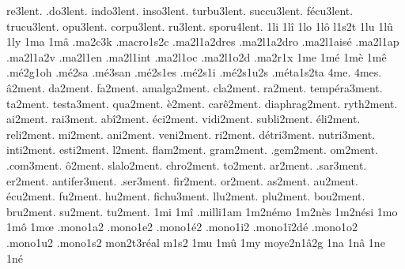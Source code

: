 {    re3lent.
   .do3lent.
  indo3lent.
  inso3lent.
 turbu3lent.
 succu3lent.
  fécu3lent.
 trucu3lent.
   opu3lent.
 corpu3lent.
    ru3lent.
 sporu4lent.
%
1li
1lî
1lo
1lô
l1s2t
1lu
1lû
1ly
1ma
1mâ
                    .ma2c3k
                    .macro1s2c
                    .ma2l1a2dres
                    .ma2l1a2dro
                    .ma2l1aisé
                    .ma2l1ap
                    .ma2l1a2v
                    .ma2l1en
                    .ma2l1int
                    .ma2l1oc
                    .ma2l1o2d
                    .ma2r1x %
1me
1mé
1mè
1mê
                    .mé2g1oh
                    .mé2sa %
                    .mé3san %
                    .mé2s1es
                    .mé2s1i
                    .mé2s1u2s
                    .méta1s2ta
4me.
4mes.
       â2ment.
       da2ment.
       fa2ment.
   amalga2ment.
      cla2ment.
       ra2ment.
  tempéra3ment.
       ta2ment.
    testa3ment.
      qua2ment.
        è2ment.
     carê2ment.
 diaphrag2ment.
     ryth2ment.
       ai2ment.
      rai3ment.
      abî2ment.
      éci2ment.
     vidi2ment.
    subli2ment.
      éli2ment.
     reli2ment.
       mi2ment.
      ani2ment.
     veni2ment.
       ri2ment.
    détri3ment.
    nutri3ment.
     inti2ment.
     esti2ment.
        l2ment.
     flam2ment.
     gram2ment.
     .gem2ment.
       om2ment.
     .com3ment.
        ô2ment.
    slalo2ment.
     chro2ment.
       to2ment.
       ar2ment.
     .sar3ment.
       er2ment.
  antifer3ment.
     .ser3ment.
      fir2ment.
       or2ment.
       as2ment.
       au2ment.
      écu2ment.
       fu2ment.
       hu2ment.
    fichu3ment.
      llu2ment.
      plu2ment.
      bou2ment.
      bru2ment.
       su2ment.
       tu2ment.
%
1mi
1mî
                    .milli1am
                    1m2némo
                    1m2nès
                    1m2nési
1mo
1mô
1mœ
                    .mono1a2
                    .mono1e2
                    .mono1é2
                    .mono1i2
                    .mono1ï2dé
                    .mono1o2
                    .mono1u2
                    .mono1s2
                    mon2t3réal %
m1s2
1mu
1mû
1my
                    moye2n1â2g
1na
1nâ
1ne
1né
}
